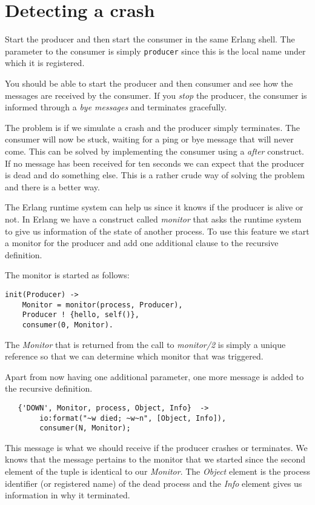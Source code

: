 \documentclass[a4paper, 11pt]{article}
\begin{document}
\section{Detecting a crash}

Start the producer and then start the consumer in the same Erlang
shell. The parameter to the consumer is simply {\tt producer} since
this is the local name under which it is registered. 

You should be able to start the producer and then consumer and see how
the messages are received by the consumer. If you {\em stop} the
producer, the consumer is informed through a {\em bye messages} and
terminates gracefully.

The problem is if we simulate a crash and the producer simply
terminates. The consumer will now be stuck, waiting for a ping or bye
message that will never come. This can be solved by implementing the
consumer using a {\em after} construct. If no message has been
received for ten seconds we can expect that the producer is dead and
do something else. This is a rather crude way of solving the problem
and there is a better way.

The Erlang runtime system can help us since it knows if the producer
is alive or not. In Erlang we have a construct called {\em monitor}
that asks the runtime system to give us information of the state of
another process. To use this feature we start a monitor for the
producer and add one additional clause to the recursive definition.

The monitor is started as follows:

\begin{verbatim}
init(Producer) ->
    Monitor = monitor(process, Producer),
    Producer ! {hello, self()},
    consumer(0, Monitor).
\end{verbatim}

The {\em Monitor} that is returned from the call to {\em monitor/2} is
simply a unique reference so that we can determine which monitor that
was triggered. 

Apart from now having one additional parameter, one more message is
added to the recursive definition.

\begin{verbatim}
   {'DOWN', Monitor, process, Object, Info}  ->
        io:format("~w died; ~w~n", [Object, Info]),
        consumer(N, Monitor);
\end{verbatim}

This message is what we should receive if the producer crashes or
terminates. We knows that the message pertains to the monitor that we
started since the second element of the tuple is identical to our {\em
  Monitor}. The {\em Object} element is the process identifier (or
registered name) of the dead process and the {\em Info} element gives
us information in why it terminated.
\end{document}
